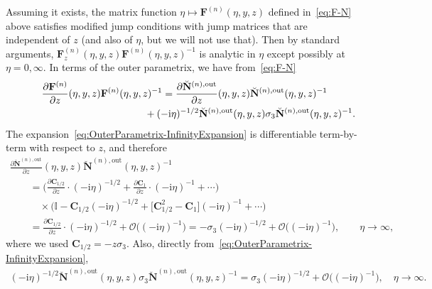 Assuming it exists, the matrix function $\eta\mapsto \mathbf{F}^{(n)}(\eta,y,z)$ defined in~\eqref{eq:F-N} above satisfies modified jump conditions with jump matrices that are independent of $z$ (and also of $\eta$, but we will not use that). Then by standard arguments, $\mathbf{F}^{(n)}_z(\eta,y,z)\mathbf{F}^{(n)}(\eta,y,z)^{-1}$ is analytic in $\eta$ except possibly at $\eta=0,\infty$. In terms of the outer parametrix, we have from~\eqref{eq:F-N}
\begin{gather*}
\frac{\partial\mathbf{F}^{(n)}}{\partial z}(\eta,y,z)\mathbf{F}^{(n)}(\eta,y,z)^{-1} = \frac{\partial\breve{\mathbf{N}}^{(n),\mathrm{out}}}{\partial z}(\eta,y,z)\breve{\mathbf{N}}^{(n),\mathrm{out}}(\eta,y,z)^{-1} \\
\hphantom{\frac{\partial\mathbf{F}^{(n)}}{\partial z}(\eta,y,z)\mathbf{F}^{(n)}(\eta,y,z)^{-1} =}{}
+ (-\mathrm{i}\eta)^{-1/2}\breve{\mathbf{N}}^{(n),\mathrm{out}}(\eta,y,z)\sigma_3\breve{\mathbf{N}}^{(n),\mathrm{out}}(\eta,y,z)^{-1}.
\end{gather*}
The expansion~\eqref{eq:OuterParametrix-InfinityExpansion} is differentiable term-by-term with respect to $z$, and therefore
\begin{gather*}
\frac{\partial\breve{\mathbf{N}}^{(n),\mathrm{out}}}{\partial z} (\eta,y,z)\breve{\mathbf{N}}^{(n),\mathrm{out}}(\eta,y,z)^{-1}\\
 \qquad{}= \bigg(\frac{\partial\mathbf{C}_{1/2}}{\partial z} \cdot(-\mathrm{i}\eta)^{-1/2} +\frac{\partial\mathbf{C}_1}{\partial z}\cdot (-\mathrm{i}\eta)^{-1} + \cdots\bigg) \\
 \qquad\quad{} \times\bigl(\mathbb{I}-\mathbf{C}_{1/2}(-\mathrm{i}\eta)^{-1/2} + \big[\mathbf{C}_{1/2}^2-\mathbf{C}_1\big](-\mathrm{i}\eta)^{-1} + \cdots\bigr)\\
 \qquad{} = \frac{\partial \mathbf{C}_{1/2}}{\partial z}\cdot (-\mathrm{i}\eta)^{-1/2} + \mathcal{O}\bigl((-\mathrm{i}\eta)^{-1}\bigr)
 = -\sigma_3(-\mathrm{i}\eta)^{-1/2}+\mathcal{O}\bigl((-\mathrm{i}\eta)^{-1}\bigr),\qquad\eta\to\infty,
\end{gather*}
where we used $\mathbf{C}_{1/2}=-z\sigma_3$. Also, directly from~\eqref{eq:OuterParametrix-InfinityExpansion},
\begin{gather*}
(-\mathrm{i}\eta)^{-1/2}\breve{\mathbf{N}}^{(n),\mathrm{out}}(\eta,y,z)\sigma_3\breve{\mathbf{N}}^{(n),\mathrm{out}}(\eta,y,z)^{-1}=\sigma_3 (-\mathrm{i}\eta)^{-1/2} + \mathcal{O}\bigl((-\mathrm{i}\eta)^{-1}\bigr),\quad\eta\to\infty.
\end{gather*}
